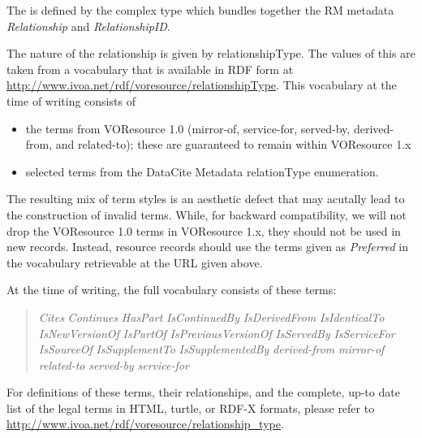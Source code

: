 \documentclass[11pt,a4paper]{ivoa}
\begin{document}


The  is defined by the
 complex type which bundles together the
RM metadata \emph{Relationship} and
\emph{RelationshipID}.  

The nature of the relationship is given by relationshipType.  The values
of this are taken from a vocabulary that is available in RDF form at
\url{http://www.ivoa.net/rdf/voresource/relationshipType}.  This
vocabulary at the time of writing consists of 

\begin{itemize}
\item the terms from VOResource 1.0 (mirror-of, service-for, served-by,
derived-from, and related-to); these are guaranteed to remain within
VOResource 1.x
\item selected terms from the DataCite Metadata relationType enumeration.
\end{itemize}

The resulting mix of term styles is an aesthetic defect that may
acutally lead to the construction of invalid terms.  While, for backward
compatibility, we will not drop the VOResource 1.0 terms in
VOResource 1.x, they should not be used in new records.  Instead,
resource records should use the terms given as \emph{Preferred} in the
vocabulary retrievable at the URL given above.

At the time of writing, the full vocabulary consists of these terms:

\begin{quotation}\noindent
\textsl{Cites}
\textsl{Continues}
\textsl{HasPart}
\textsl{IsContinuedBy}
\textsl{IsDerivedFrom}
\textsl{IsIdenticalTo}
\textsl{IsNewVersionOf}
\textsl{IsPartOf}
\textsl{IsPreviousVersionOf}
\textsl{IsServedBy}
\textsl{IsServiceFor}
\textsl{IsSourceOf}
\textsl{IsSupplementTo}
\textsl{IsSupplementedBy}
\textsl{derived-from}
\textsl{mirror-of}
\textsl{related-to}
\textsl{served-by}
\textsl{service-for}

\end{quotation}

For definitions of these terms, their relationships, and the complete,
up-to date list of the legal terms in HTML, turtle, or RDF-X formats,
please refer to \url{http://www.ivoa.net/rdf/voresource/relationship_type}.
\end{document}
